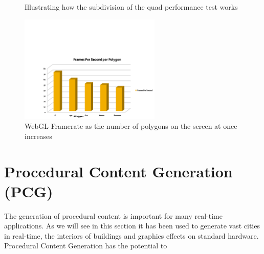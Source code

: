 \begin{figure}
  \centering
  \caption{Illustrating how the subdivision of the quad performance test works}
  \label{fig:webgl_perf}
\end{figure}

\begin{figure}
  \centering
  \includegraphics[width=0.6\textwidth]{images/webgl_perf_graph}
  \caption{WebGL Framerate as the number of polygons on the screen at once increases}
  \label{fig:webgl_perf_graph}
\end{figure}


\section{Procedural Content Generation (PCG)}
\label{sec:pcg}
The generation of procedural content is important for many real-time applications. 
As we will see in this section it has been used to generate vast cities in real-time, the interiors of buildings and graphics effects on standard hardware.
Procedural Content Generation has the potential to 

